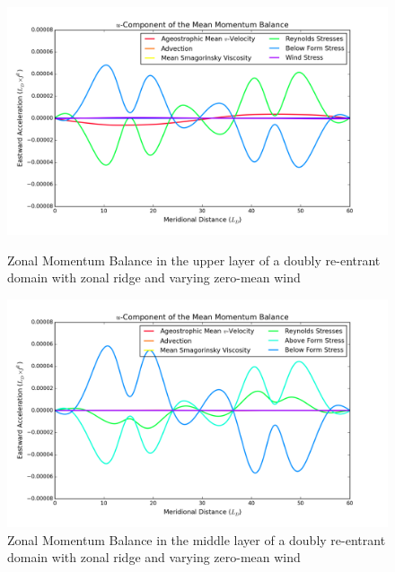 \documentclass[12pt,a4paper]{report}
\begin{document}
 \begin{figure}
 	\centering
 	\begin{minipage}[b]{0.45\linewidth}
 		\centering
 		\includegraphics[width=\linewidth ]{umom_3}
 		\caption{Zonal Momentum Balance in the upper layer of 
 			a doubly re-entrant domain with 
 			zonal ridge and varying zero-mean wind}
 		\label{fig:umomlayer3}
 	\end{minipage}
 	\quad
 	\begin{minipage}[b]{0.45\linewidth}
 		\centering
 		\includegraphics[width=\linewidth ]{umom_2}
 		\caption{Zonal Momentum Balance in the middle layer of 
 			a doubly re-entrant domain with 
 			zonal ridge and varying zero-mean wind}
 		\label{fig:umomlayer2}
 	\end{minipage}
 \end{figure}
 
\end{document}
